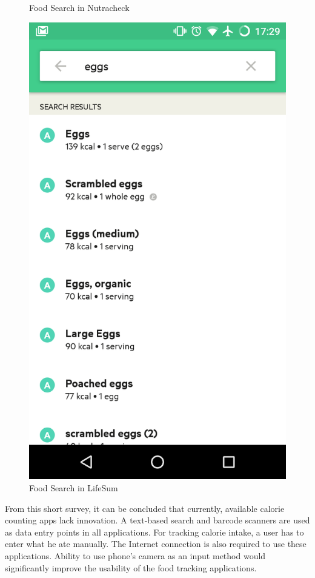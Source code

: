 \begin{figure}[!tbp]
\begin{minipage}[b]{0.4\textwidth}
    \caption{Food  Search in Nutracheck}
    \label{fig:eat}
  \end{minipage}
  \hfill
  \begin{minipage}[b]{0.4\textwidth}
    \includegraphics[width=\textwidth]{Figures/2/mm.png}
    \caption{Food  Search in LifeSum}
    \label{fig:life}
  \end{minipage}
\end{figure}


From this short survey, it can be concluded that currently, available calorie counting apps lack innovation. A text-based search and barcode scanners are used as data entry points in all applications. For tracking calorie intake, a user has to enter what he ate manually. The Internet connection is also required to use these applications. Ability to use phone's camera as an input method would significantly improve the usability of the food tracking applications. 

